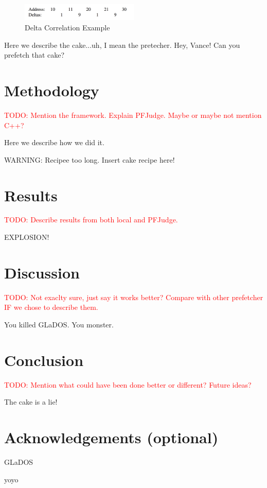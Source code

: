 \documentclass[a4paper]{IEEEtran}
\newcommand\TODO[1]{\textcolor{red}{TODO:#1}}
\newcommand\todo[1]{\TODO{#1}}
\begin{document}
\begin{figure}[h!]
  \centering
      \includegraphics[width=0.5\textwidth]{Figures/DCExample}
  \caption{Delta Correlation Example}
  \label{fig:DCExample}
\end{figure}


Here we describe the cake...uh, I mean the pretecher. Hey, Vance! Can you prefetch that cake?
\section{Methodology}
\todo{ Mention the framework. Explain PFJudge. Maybe or maybe not mention C++?}
\break

Here we describe how we did it.

WARNING: Recipee too long. Insert cake recipe here!
\section{Results}
\todo{ Describe results from both local and PFJudge.}
\break

EXPLOSION!
\section{Discussion}
\todo{ Not exaclty sure, just say it works better? Compare with other prefetcher IF we chose to describe them. }
\break


You killed GLaDOS.
You monster.
\section{Conclusion}
\todo{ Mention what could have been done better or different? Future ideas? }
\break

The cake is a lie!
\section{Acknowledgements (optional)}
GLaDOS

yoyo \cite{assignment-text}



\nocite{*}
\end{document}
